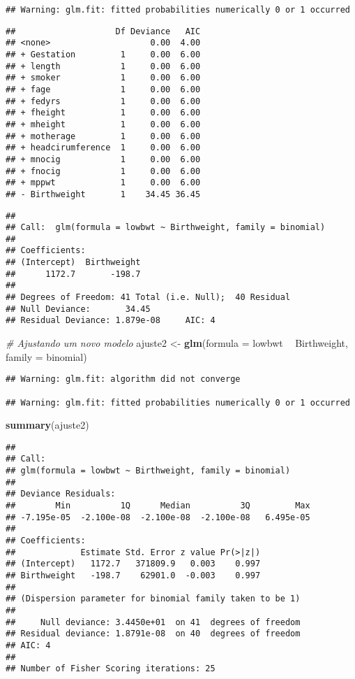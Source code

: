 \documentclass[]{article}
\newenvironment{Shaded}{\begin{snugshade}}{\end{snugshade}}
\newcommand{\CommentTok}[1]{\textcolor[rgb]{0.56,0.35,0.01}{\textit{#1}}}
\newcommand{\DataTypeTok}[1]{\textcolor[rgb]{0.13,0.29,0.53}{#1}}
\newcommand{\KeywordTok}[1]{\textcolor[rgb]{0.13,0.29,0.53}{\textbf{#1}}}
\newcommand{\NormalTok}[1]{#1}
\newcommand{\OperatorTok}[1]{\textcolor[rgb]{0.81,0.36,0.00}{\textbf{#1}}}
\newcommand{\StringTok}[1]{\textcolor[rgb]{0.31,0.60,0.02}{#1}}
\begin{document}
\begin{verbatim}
## Warning: glm.fit: fitted probabilities numerically 0 or 1 occurred
\end{verbatim}

\begin{verbatim}
##                    Df Deviance   AIC
## <none>                    0.00  4.00
## + Gestation         1     0.00  6.00
## + length            1     0.00  6.00
## + smoker            1     0.00  6.00
## + fage              1     0.00  6.00
## + fedyrs            1     0.00  6.00
## + fheight           1     0.00  6.00
## + mheight           1     0.00  6.00
## + motherage         1     0.00  6.00
## + headcirumference  1     0.00  6.00
## + mnocig            1     0.00  6.00
## + fnocig            1     0.00  6.00
## + mppwt             1     0.00  6.00
## - Birthweight       1    34.45 36.45
\end{verbatim}

\begin{verbatim}
## 
## Call:  glm(formula = lowbwt ~ Birthweight, family = binomial)
## 
## Coefficients:
## (Intercept)  Birthweight  
##      1172.7       -198.7  
## 
## Degrees of Freedom: 41 Total (i.e. Null);  40 Residual
## Null Deviance:       34.45 
## Residual Deviance: 1.879e-08     AIC: 4
\end{verbatim}

\begin{Shaded}
\begin{Highlighting}[]
\CommentTok{# Ajustando um novo modelo}
\NormalTok{ajuste2 <-}\StringTok{ }\KeywordTok{glm}\NormalTok{(}\DataTypeTok{formula =}\NormalTok{ lowbwt }\OperatorTok{~}\StringTok{ }\NormalTok{Birthweight, }\DataTypeTok{family =}\NormalTok{ binomial)}
\end{Highlighting}
\end{Shaded}

\begin{verbatim}
## Warning: glm.fit: algorithm did not converge

## Warning: glm.fit: fitted probabilities numerically 0 or 1 occurred
\end{verbatim}

\begin{Shaded}
\begin{Highlighting}[]
\KeywordTok{summary}\NormalTok{(ajuste2)}
\end{Highlighting}
\end{Shaded}

\begin{verbatim}
## 
## Call:
## glm(formula = lowbwt ~ Birthweight, family = binomial)
## 
## Deviance Residuals: 
##        Min          1Q      Median          3Q         Max  
## -7.195e-05  -2.100e-08  -2.100e-08  -2.100e-08   6.495e-05  
## 
## Coefficients:
##             Estimate Std. Error z value Pr(>|z|)
## (Intercept)   1172.7   371809.9   0.003    0.997
## Birthweight   -198.7    62901.0  -0.003    0.997
## 
## (Dispersion parameter for binomial family taken to be 1)
## 
##     Null deviance: 3.4450e+01  on 41  degrees of freedom
## Residual deviance: 1.8791e-08  on 40  degrees of freedom
## AIC: 4
## 
## Number of Fisher Scoring iterations: 25
\end{verbatim}
\end{document}
